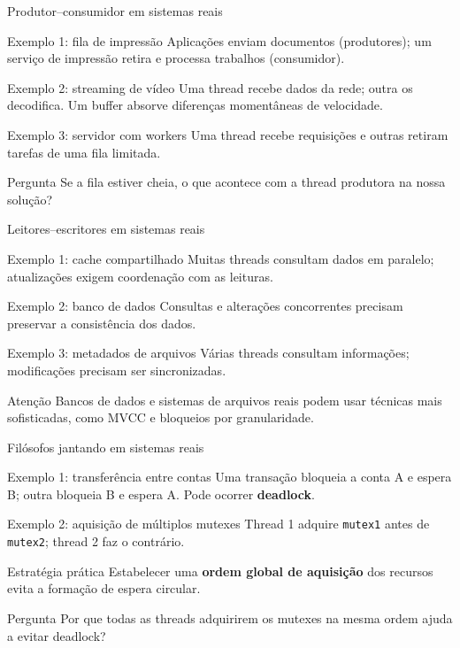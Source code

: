 \documentclass[aspectratio=169,11pt]{beamer}
\begin{document}
\begin{frame}{Produtor--consumidor em sistemas reais}
\small
\begin{block}{Exemplo 1: fila de impressão}
Aplicações enviam documentos (produtores); um serviço de impressão retira e processa trabalhos (consumidor).
\end{block}
\begin{block}{Exemplo 2: streaming de vídeo}
Uma thread recebe dados da rede; outra os decodifica. Um buffer absorve diferenças momentâneas de velocidade.
\end{block}
\begin{block}{Exemplo 3: servidor com workers}
Uma thread recebe requisições e outras retiram tarefas de uma fila limitada.
\end{block}
\begin{alertblock}{Pergunta}
Se a fila estiver cheia, o que acontece com a thread produtora na nossa solução?
\end{alertblock}
\end{frame}

\begin{frame}{Leitores--escritores em sistemas reais}
\small
\begin{block}{Exemplo 1: cache compartilhado}
Muitas threads consultam dados em paralelo; atualizações exigem coordenação com as leituras.
\end{block}
\begin{block}{Exemplo 2: banco de dados}
Consultas e alterações concorrentes precisam preservar a consistência dos dados.
\end{block}
\begin{block}{Exemplo 3: metadados de arquivos}
Várias threads consultam informações; modificações precisam ser sincronizadas.
\end{block}
\begin{alertblock}{Atenção}
Bancos de dados e sistemas de arquivos reais podem usar técnicas mais sofisticadas, como MVCC e bloqueios por granularidade.
\end{alertblock}
\end{frame}

\begin{frame}{Filósofos jantando em sistemas reais}
\small
\begin{block}{Exemplo 1: transferência entre contas}
Uma transação bloqueia a conta A e espera B; outra bloqueia B e espera A. Pode ocorrer \textbf{deadlock}.
\end{block}
\begin{block}{Exemplo 2: aquisição de múltiplos mutexes}
Thread 1 adquire \texttt{mutex1} antes de \texttt{mutex2}; thread 2 faz o contrário.
\end{block}
\begin{block}{Estratégia prática}
Estabelecer uma \textbf{ordem global de aquisição} dos recursos evita a formação de espera circular.
\end{block}
\begin{alertblock}{Pergunta}
Por que todas as threads adquirirem os mutexes na mesma ordem ajuda a evitar deadlock?
\end{alertblock}
\end{frame}
\end{document}
